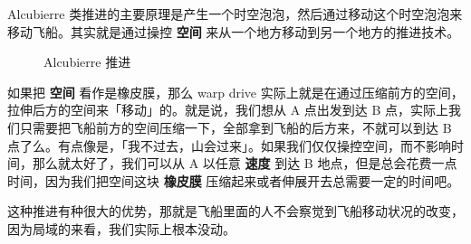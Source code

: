 \documentclass[letterpaper,10pt,english]{sphinxmanual}
\begin{document}
Alcubierre 类推进的主要原理是产生一个时空泡泡，然后通过移动这个时空泡泡来移动飞船。其实就是通过操控 \textbf{空间} 来从一个地方移动到另一个地方的推进技术。
\begin{figure}[htbp]
\centering
\capstart
\caption{Alcubierre 推进}\end{figure}

如果把 \textbf{空间} 看作是橡皮膜，那么 warp drive 实际上就是在通过压缩前方的空间，拉伸后方的空间来「移动」的。就是说，我们想从 A 点出发到达 B 点，实际上我们只需要把飞船前方的空间压缩一下，全部拿到飞船的后方来，不就可以到达 B 点了么。有点像是，「我不过去，山会过来」。如果我们仅仅操控空间，而不影响时间，那么就太好了，我们可以从 A 以任意 \textbf{速度} 到达 B 地点，但是总会花费一点时间，因为我们把空间这块 \textbf{橡皮膜} 压缩起来或者伸展开去总需要一定的时间吧。

这种推进有种很大的优势，那就是飞船里面的人不会察觉到飞船移动状况的改变，因为局域的来看，我们实际上根本没动。
\end{document}
